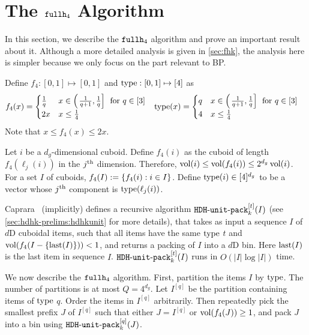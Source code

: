 \section{The \texorpdfstring{$\fhk[4]$}{fullh4} Algorithm}
\label{sec:fh4}

In this section, we describe the $\fhk[4]$ algorithm
and prove an important result about it.
Although a more detailed analysis is given in \cref{sec:fhk},
the analysis here is simpler because we only focus on the part relevant
to  BP.

Define $f_4: [0, 1] \mapsto [0, 1]$ and $\type: [0, 1] \mapsto [4]$ as
\begin{align*}
f_4(x) &= \begin{cases}
\frac{1}{q} & x \in \left(\left.\frac{1}{q+1}, \frac{1}{q}\right]\right. \textrm{ for } q \in [3]
\\ 2x & x \le \frac{1}{4} \end{cases}
& \type(x) &= \begin{cases}
q & x \in \left(\left.\frac{1}{q+1}, \frac{1}{q}\right]\right. \textrm{ for } q \in [3]
\\ 4 & x \le \frac{1}{4} \end{cases}
\end{align*}
Note that $x \le f_4(x) \le 2x$.
\begin{comment}
\right)\right) %
\end{comment}

Let $i$ be a $d_g$-dimensional cuboid.
Define $f_4(i)$ as the cuboid of length $f_4(\ell_j(i))$ in the $j\Th$ dimension.
Therefore, $\vol(i) \le \vol(f_4(i)) \le 2^{d_g}\vol(i)$.
For a set $I$ of cuboids, $f_4(I) \defeq \{f_4(i): i \in I\}$.
Define $\type(i) \in [4]^{d_g}$ to be a vector
whose $j\Th$ component is $\type(\ell_j(i))$.

Caprara~\cite{caprara2008} (implicitly) defines a recursive algorithm $\hdhkunit^{[t]}(I)$
(see \cref{sec:hdhk-prelims:hdhkunit} for more details),
that takes as input a sequence $I$ of $d$D cuboidal items, such that
all items have the same $\type$ $t$ and $\vol(f_4(I-\{\last(I)\})) < 1$,
and returns a packing of $I$ into a $d$D bin.
Here $\last(I)$ is the last item in sequence $I$.
$\hdhkunit^{[t]}(I)$ runs in $O(|I|\log|I|)$ time.

We now describe the $\fhk[4]$ algorithm.
First, partition the items $I$ by $\type$. The number of partitions is at most $Q = 4^{d_g}$.
Let $I^{[q]}$ be the partition containing items of $\type$ $q$.
Order the items in $I^{[q]}$ arbitrarily.
Then repeatedly pick the smallest prefix $J$ of $I^{[q]}$ such that
either $J = I^{[q]}$ or $\vol(f_4(J)) \ge 1$, and pack $J$ into a bin using
$\hdhkunit^{[q]}(J)$.

